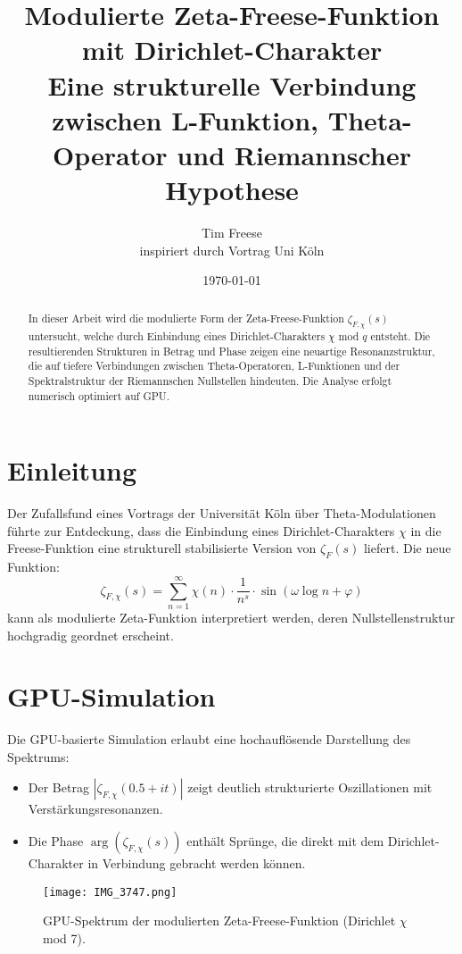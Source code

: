 \documentclass[a4paper,12pt]{article}
\title{Modulierte Zeta-Freese-Funktion mit Dirichlet-Charakter \\[1ex]
\large Eine strukturelle Verbindung zwischen L-Funktion, Theta-Operator und Riemannscher Hypothese}
\author{Tim Freese \\ inspiriert durch Vortrag Uni Köln}
\date{\today}
\begin{document}
\maketitle

\begin{abstract}
In dieser Arbeit wird die modulierte Form der Zeta-Freese-Funktion \(\zeta_{F,\chi}(s)\) untersucht, welche durch Einbindung eines Dirichlet-Charakters \(\chi\) mod \(q\) entsteht. Die resultierenden Strukturen in Betrag und Phase zeigen eine neuartige Resonanzstruktur, die auf tiefere Verbindungen zwischen Theta-Operatoren, L-Funktionen und der Spektralstruktur der Riemannschen Nullstellen hindeuten. Die Analyse erfolgt numerisch optimiert auf GPU.
\end{abstract}

\section{Einleitung}
Der Zufallsfund eines Vortrags der Universität Köln über Theta-Modulationen führte zur Entdeckung, dass die Einbindung eines Dirichlet-Charakters \(\chi\) in die Freese-Funktion eine strukturell stabilisierte Version von \(\zeta_F(s)\) liefert. Die neue Funktion:
\[
\zeta_{F,\chi}(s) = \sum_{n=1}^\infty \chi(n) \cdot \frac{1}{n^s} \cdot \sin(\omega \log n + \varphi)
\]
kann als modulierte Zeta-Funktion interpretiert werden, deren Nullstellenstruktur hochgradig geordnet erscheint.

\section{GPU-Simulation}
Die GPU-basierte Simulation erlaubt eine hochauflösende Darstellung des Spektrums:
\begin{itemize}
  \item Der Betrag \(|\zeta_{F,\chi}(0.5 + it)|\) zeigt deutlich strukturierte Oszillationen mit Verstärkungsresonanzen.
  \item Die Phase \(\arg(\zeta_{F,\chi}(s))\) enthält Sprünge, die direkt mit dem Dirichlet-Charakter in Verbindung gebracht werden können.
\end{itemize}

\begin{figure}[ht]
    \centering
    \texttt{[image: IMG\_3747.png]}
    \caption{GPU-Spektrum der modulierten Zeta-Freese-Funktion (Dirichlet \(\chi\) mod 7).}
\end{figure}
\end{document}
